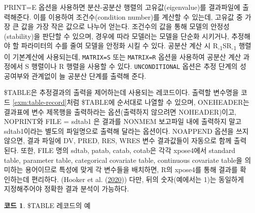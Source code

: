 \documentclass[
  11pt,
  krantz2,
  a4paper]{krantz}
\theoremstyle{definition}
\theoremstyle{definition}
\newtheorem{example}{코드}[chapter]
\theoremstyle{definition}
\theoremstyle{remark}
\begin{document}
PRINT=E 옵션을 사용하면 분산-공분산 행렬의 고유값(eigenvalue)를 결과파일에 출력해준다. 이를 이용하여 조건수(condition number)를 계산할 수 있는데, 고유값 중 가장 큰 값을 가장 작은 값으로 나누어 얻는다. 조건수의 값을 통해 모델의 안정성(stability)을 판단할 수 있으며, 경우에 따라 모델러는 모델을 단순화 시키거나, 추정해야 할 파라미터의 수를 줄여 모델을 안정화 시킬 수 있다. 공분산 계산 시 R\textsubscript{-1}SR\textsubscript{-1} 행렬이 기본계산에 사용되는데, \texttt{MATRIX=S} 또는 \texttt{MATRIX=R} 옵션을 사용하여 공분산 계산 과정에서 S 행렬이나 R 행렬을 사용할 수 있다. \texttt{UNCONDITIONAL} 옵션은 추정 단계의 성공여부와 관계없이 늘 공분산 단계를 출력해 준다.

\$TABLE은 추정결과의 출력을 제어하는데 사용되는 레코드이다. 출력할 변수명을 코드 \ref{exm:table-record}처럼 \$TABLE에 순서대로 나열할 수 있으며, ONEHEADER는 결과표에 변수 제목행을 출력하라는 옵션(출력하지 않으려면 NOHEADER)이고, NOPRINT와 FILE = sdtab1 은 결과를 NONMEM 보고파일 내에 출력하지 말고 sdtab1이라는 별도의 파일명으로 출력해 달라는 옵션이다. NOAPPEND 옵션을 쓰지 않으면, 결과 파일에 DV, PRED, RES, WRES 변수 결과값들이 자동으로 함께 출력된다. 또한, FILE 명의 sdtab, patab, catab, cotab은 각각 xpose4에서 standard table, parameter table, categorical covariate table, continuous covariate table을 의미하는 용어이므로 특성에 맞게 각 변수들을 배치하면, R의 xpose4를 통해 결과를 확인하는데 편리하다. (Hooker et al. (\protect\hyperlink{ref-R-xpose4}{2020})) 다만, 뒤의 숫자(예에서는 1)는 동일하게 지정해주어야 정확한 결과 분석이 가능하다.

\begin{example}
\protect\hypertarget{exm:table-record}{}{\label{exm:table-record} }\$TABLE 레코드의 예
\end{example}
\end{document}

